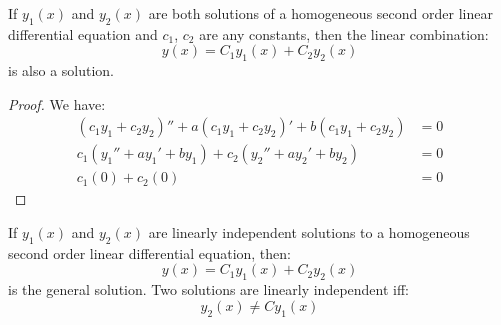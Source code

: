\documentclass{article}
\begin{document}
\begin{itemize}
    \begin{theorem}
        If $y_1(x)$ and $y_2(x)$ are both solutions of a homogeneous second order linear differential equation and $c_1$, $c_2$ are any constants, then the linear combination:
        \begin{equation}
            y(x) = C_1y_1(x) + C_2y_2(x)
            \label{eq:}
        \end{equation}
        is also a solution.
        \begin{proof}We have:
        \begin{align}
            (c_1y_1+c_2y_2)'' + a(c_1y_1+c_2y_2)' + b(c_1y_1+c_2y_2) &= 0 \\ 
            c_1(y_1''+ay_1'+by_1) + c_2(y_2''+ay_2'+by_2) &= 0 \\ 
            c_1(0) + c_2(0) &= 0
        \end{align}
        \end{proof}
    \end{theorem}
    \begin{theorem}
        If $y_1(x)$ and $y_2(x)$ are linearly independent solutions to a homogeneous second order linear differential equation, then:
        \begin{equation}
            y(x) = C_1y_1(x) + C_2y_2(x)
            \label{eq:}
        \end{equation}
        is the general solution. Two solutions are linearly independent iff:
        \begin{equation}
            y_2(x) \neq Cy_1(x)
            \label{eq:}
        \end{equation}
    \end{theorem}
\end{itemize}
\end{document}
